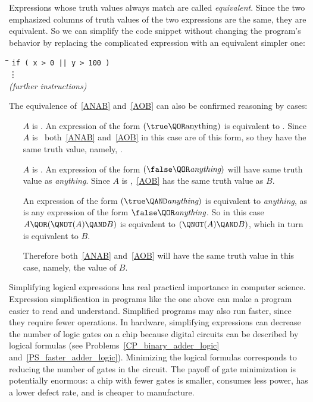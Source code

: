 Expressions whose truth values always match are called%
\emph{equivalent}.  Since the two emphasized columns of truth values
of the two expressions are the same, they are equivalent.  So we can
simplify the code snippet without changing the program's behavior by
replacing the complicated expression with an equivalent simpler one:
%
\begin{tabbing}
\hspace{1in} \= \quad\quad \= \quad\quad \= \quad\quad \= \kill
\> \texttt{if ( x > 0 || y > 100 )} \\
\> \> \vdots\\
\> \emph{(further instructions)}
\end{tabbing}

The equivalence of~\eqref{ANAB} and~\eqref{AOB} can also be confirmed
reasoning by cases:
\begin{itemize}
\item[$A$ is \true.]  An expression of the form $(\true \QOR
  \text{anything})$ is equivalent to \true.  Since $A$ is \true\
  both~\eqref{ANAB} and~\eqref{AOB} in this case are of this form, so they
  have the same truth value, namely, \true.

\item[$A$ is \false.]  An expression of the form $(\false \QOR
  \textit{anything})$ will have same truth value as \emph{anything}.
  Since $A$ is \false,~\eqref{AOB} has the same truth value as $B$.

   An expression of the form $(\true \QAND \textit{anything})$ is
   equivalent to \emph{anything}, as is any expression of the form
   $\false \QOR \emph{anything}$.  So in this case $A \QOR (\QNOT(A)
   \QAND B)$ is equivalent to $(\QNOT(A) \QAND B)$, which in turn is
   equivalent to $B$.

   Therefore both~\eqref{ANAB} and~\eqref{AOB} will have the same truth
   value in this case, namely, the value of $B$.
\end{itemize}

Simplifying logical expressions has real practical importance in
computer science.  Expression simplification in programs like the one
above can make a program easier to read and understand. Simplified
programs may also run faster, since they require fewer operations.  In
hardware, simplifying expressions can decrease the number of logic
gates on a chip because digital circuits can be described by
logical formulas (see Problems~\ref{CP_binary_adder_logic}
and~\ref{PS_faster_adder_logic}).  Minimizing the logical formulas
corresponds to reducing the number of gates in the circuit.  The
payoff of gate minimization is potentially enormous: a chip with fewer
gates is smaller, consumes less power, has a lower defect rate, and is
cheaper to manufacture.

